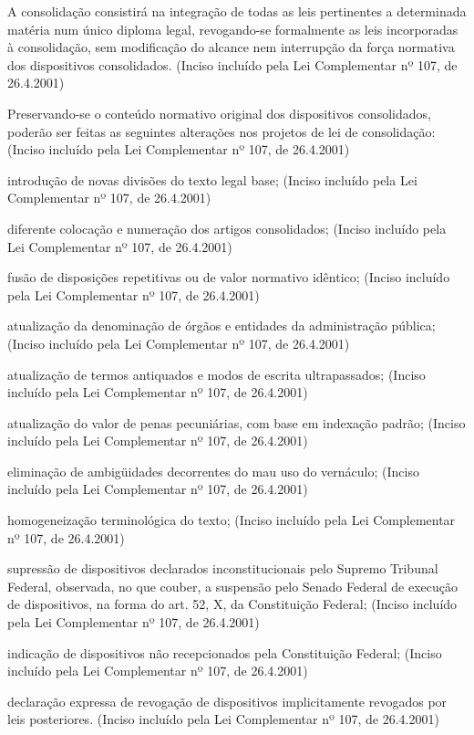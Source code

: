 \documentclass[calibri]{brlex2}
\begin{document}
\so A consolidação consistirá na integração de todas as leis pertinentes a determinada matéria num único diploma legal, revogando-se formalmente as leis incorporadas à consolidação, sem modificação do alcance nem interrupção da força normativa dos dispositivos consolidados.     (Inciso incluído pela Lei Complementar nº 107, de 26.4.2001)

\so Preservando-se o conteúdo normativo original dos dispositivos consolidados, poderão ser feitas as seguintes alterações nos projetos de lei de consolidação:     (Inciso incluído pela Lei Complementar nº 107, de 26.4.2001)

\inc introdução de novas divisões do texto legal base;     (Inciso incluído pela Lei Complementar nº 107, de 26.4.2001)

\inc diferente colocação e numeração dos artigos consolidados;      (Inciso incluído pela Lei Complementar nº 107, de 26.4.2001)

\inc fusão de disposições repetitivas ou de valor normativo idêntico;    (Inciso incluído pela Lei Complementar nº 107, de 26.4.2001)

\inc atualização da denominação de órgãos e entidades da administração pública;     (Inciso incluído pela Lei Complementar nº 107, de 26.4.2001)

\inc atualização de termos antiquados e modos de escrita ultrapassados;    (Inciso incluído pela Lei Complementar nº 107, de 26.4.2001)

\inc atualização do valor de penas pecuniárias, com base em indexação padrão;       (Inciso incluído pela Lei Complementar nº 107, de 26.4.2001)

\inc eliminação de ambigüidades decorrentes do mau uso do vernáculo;       (Inciso incluído pela Lei Complementar nº 107, de 26.4.2001)

\inc homogeneização terminológica do texto;     (Inciso incluído pela Lei Complementar nº 107, de 26.4.2001)

\inc supressão de dispositivos declarados inconstitucionais pelo Supremo Tribunal Federal, observada, no que couber, a suspensão pelo Senado Federal de execução de dispositivos, na forma do art. 52, X, da Constituição Federal;      (Inciso incluído pela Lei Complementar nº 107, de 26.4.2001)

\inc indicação de dispositivos não recepcionados pela Constituição Federal;     (Inciso incluído pela Lei Complementar nº 107, de 26.4.2001)

\inc declaração expressa de revogação de dispositivos implicitamente revogados por leis posteriores.     (Inciso incluído pela Lei Complementar nº 107, de 26.4.2001)
\end{document}
